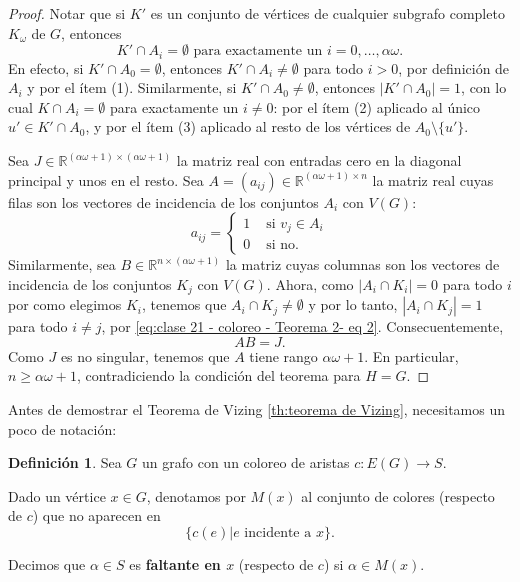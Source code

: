 \documentclass[12pt]{report}
\theoremstyle{plain}
\theoremstyle{definition}
\newtheorem{definition}[theorem]{Definición}
\newcommand{\reals}{\mathbb{R}}
\newcommand{\abs}[1]{\left \vert #1 \right \vert}
\begin{document}
\begin{proof}
Notar que si $K'$ es un conjunto de vértices de cualquier subgrafo completo $K_\omega$ de $G$, entonces
\begin{equation}\label{eq:clase 21 - coloreo - Teorema 2- eq 2}
K' \cap A_i = \emptyset \text{ para exactamente un $i = 0 , \ldots, \alpha \omega$}.
\end{equation}
En efecto, si $K' \cap A_0 = \emptyset$, entonces $K' \cap A_i \neq \emptyset$ para todo $i > 0$, por definición de $A_i$ y por el ítem (1). Similarmente, si $K' \cap A_0 \neq \emptyset$, entonces $\abs{K' \cap A_0} = 1$, con lo cual $K \cap A_i = \emptyset$ para exactamente un $i \neq 0$: por el ítem (2) aplicado al único $u' \in K' \cap A_0$, y por el ítem (3) aplicado al resto de los vértices de $A_0 \setminus \{u'\}$.

Sea $J \in \reals^{(\alpha \omega + 1) \times (\alpha \omega + 1)}$ la matriz real con entradas cero en la diagonal principal y unos en el resto. Sea $A = (a_{ij}) \in \reals^{(\alpha \omega + 1) \times n}$ la matriz real cuyas filas son los vectores de incidencia de los conjuntos $A_i$ con $V(G)$:
\[
    a_{ij} = \begin{cases}
            1 & \text{ si $v_j \in A_i$} \\
            0 & \text{ si no}.
    \end{cases}
\]
Similarmente, sea $B \in \reals^{n \times (\alpha \omega + 1)}$ la matriz cuyas columnas son los vectores de incidencia de los conjuntos $K_j$ con $V(G)$. Ahora, como $\abs{ A_i \cap K_i} = 0$ para todo $i$ por como elegimos $K_i$, tenemos que $A_i \cap K_j \neq \emptyset$ y por lo tanto, $\abs{ A_i \cap K_j} = 1$ para todo $i \neq j$, por \eqref{eq:clase 21 - coloreo - Teorema 2- eq 2}. Consecuentemente,
\[
    AB = J.
\]
Como $J$ es no singular, tenemos que $A$ tiene rango $\alpha \omega + 1$. En particular, $n \geq \alpha \omega + 1$, contradiciendo la condición del teorema para $H = G$.
\end{proof}



Antes de demostrar el Teorema de Vizing \ref{th:teorema de Vizing}, necesitamos un poco de notación:
\begin{definition}
Sea $G$ un grafo con un coloreo de aristas $c: E(G) \rightarrow S$.

Dado un vértice $x \in G$, denotamos por $M(x)$ al conjunto de colores (respecto de $c$) que no aparecen en
\[
    \{c(e) | \text{$e$ incidente a $x$}\}.
\]

Decimos que $\alpha \in S$ es \textbf{faltante en $x$} (respecto de $c$) si $\alpha \in M(x)$.
\end{definition}
\end{document}
